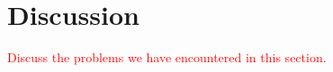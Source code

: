 
\section{Discussion}
\label{sec:discussion}

\textcolor{red}{Discuss the problems we have encountered in this section.}


